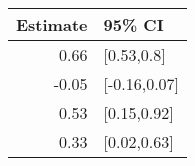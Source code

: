 \begin{tabular}{rl}
  \hline
Estimate & 95\% CI \\ 
  \hline
0.66 & [0.53,0.8] \\ 
  -0.05 & [-0.16,0.07] \\ 
  0.53 & [0.15,0.92] \\ 
  0.33 & [0.02,0.63] \\ 
   \hline
\end{tabular}

